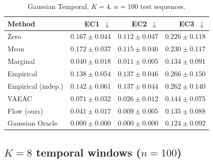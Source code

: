 \documentclass[11pt]{article}
\begin{document}
\begin{table}[h]
\centering
\caption{Gaussian Temporal, $K=4$. $n=100$ test sequences.}
\label{tab:gauss_k4}
\begin{tabular}{lrrr}
\toprule
Method               & EC1~$\downarrow$           & EC2~$\downarrow$           & EC3~$\downarrow$ \\
\midrule
Zero                 & $0.167 \pm 0.044$          & $0.112 \pm 0.047$          & $0.226 \pm 0.118$ \\
Mean                 & $0.172 \pm 0.037$          & $0.115 \pm 0.046$          & $0.230 \pm 0.117$ \\
Marginal             & $\mathbf{0.040 \pm 0.018}$ & $0.011 \pm 0.005$          & $\mathbf{0.134 \pm 0.091}$ \\
Empirical            & $0.138 \pm 0.054$          & $0.137 \pm 0.046$          & $0.266 \pm 0.150$ \\
Empirical (indep.)   & $0.142 \pm 0.061$          & $0.137 \pm 0.044$          & $0.262 \pm 0.140$ \\
VAEAC                & $0.071 \pm 0.032$          & $0.026 \pm 0.012$          & $0.144 \pm 0.075$ \\
Flow (ours)          & $0.041 \pm 0.017$          & $\mathbf{0.009 \pm 0.005}$ & $0.135 \pm 0.088$ \\
\midrule
Gaussian Oracle      & $0.000 \pm 0.000$          & $0.000 \pm 0.000$          & $0.124 \pm 0.092$ \\
\bottomrule
\end{tabular}
\end{table}

\subsection{$K = 8$ temporal windows \quad ($n = 100$)}
\end{document}
